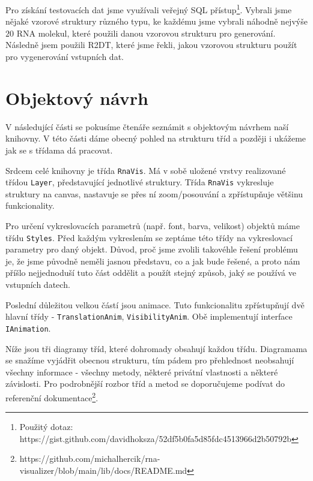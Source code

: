 Pro získání testovacích dat jsme využívali veřejný SQL přístup\footnote{Použitý
dotaz: https://gist.github.com/davidhoksza/52df5b0fa5d85fdc4513966d2b50792b}.
Vybrali jsme nějaké vzorové struktury různého typu, ke každému jsme vybrali
náhodně nejvýše $20$ RNA molekul, které použili danou vzorovou strukturu pro
generování. Následně jsem použili R2DT, které jsme řekli, jakou vzorovou
strukturu použít pro vygenerování vstupních dat.

\section{Objektový návrh}

V následující části se pokusíme čtenáře seznámit s objektovým návrhem naší
knihovny. V této části dáme obecný pohled na strukturu tříd a později i ukážeme
jak se s třídama dá pracovat.

Srdcem celé knihovny je třída \texttt{RnaVis}. Má v sobě uložené vrstvy
realizované třídou \texttt{Layer}, představující jednotlivé struktury. Třída
\texttt{RnaVis} vykresluje struktury na canvas, nastavuje se přes ní
zoom/posouvání a zpřístupňuje většinu funkcionality.

Pro určení vykreslovacích parametrů (např. font, barva, velikost) objektů  máme
třídu \texttt{Styles}. Před každým vykreslením se zeptáme této třídy na
vykreslovací parametry pro daný objekt. Důvod, proč jsme zvolili takovéhle
řešení problému je, že jsme původně neměli jasnou představu, co a jak bude
řešené, a proto nám příšlo nejjednoduší tuto část oddělit a použít stejný
způsob, jaký se používá ve vstupních datech.

Poslední důležitou velkou částí jsou animace. Tuto funkcionalitu zpřístupňují
dvě hlavní třídy - \texttt{TranslationAnim}, \texttt{VisibilityAnim}. Obě
implementují interface \texttt{IAnimation}. 

Níže jsou tři diagramy tříd, které dohromady obsahují každou třídu. Diagramama
se snažíme vyjádřit obecnou strukturu, tím pádem pro přehlednost neobsahují
všechny informace - všechny metody, některé privátní vlastnosti a některé
závislosti. Pro podrobnější rozbor tříd a metod se doporučujeme podívat do
referenční
dokumentace\footnote{https://github.com/michalhercik/rna-visualizer/blob/main/lib/docs/README.md}.
 
